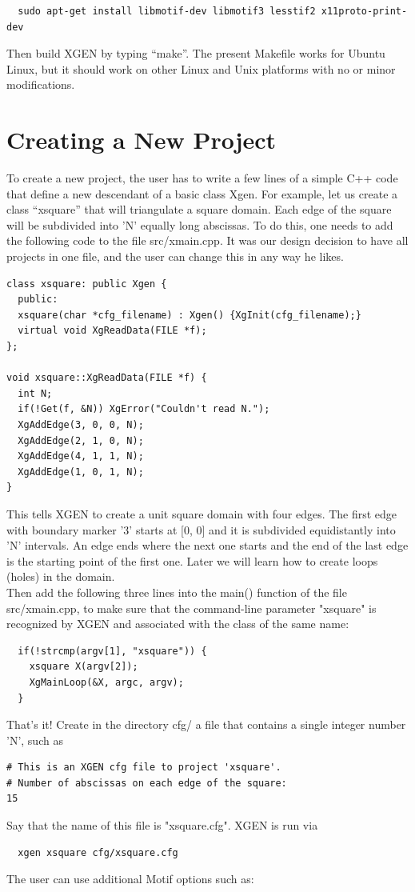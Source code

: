 \documentclass[12pt]{article}
\begin{document}
{\footnotesize
\begin{verbatim}
  sudo apt-get install libmotif-dev libmotif3 lesstif2 x11proto-print-dev
\end{verbatim}
}
\noindent
  Then build XGEN by typing ``make''. The present Makefile works for
  Ubuntu Linux, but it should work on other Linux and Unix platforms with 
  no or minor modifications.
  
  \section{Creating a New Project} \label{new-project}

  To create a new project, the user has to write 
  a few lines of a simple C++ code that define a new descendant of
  a basic class Xgen. For example, let us create a class ``xsquare''
  that will triangulate a square domain. Each edge of the square 
  will be subdivided into 'N' equally long abscissas. To do this,
  one needs to add the following code to the file src/xmain.cpp.
  It was our design decision to have all projects in one file, and
  the user can change this in any way he likes.

  \begin{verbatim}
class xsquare: public Xgen {
  public:
  xsquare(char *cfg_filename) : Xgen() {XgInit(cfg_filename);}
  virtual void XgReadData(FILE *f);
};

void xsquare::XgReadData(FILE *f) {
  int N; 
  if(!Get(f, &N)) XgError("Couldn't read N.");
  XgAddEdge(3, 0, 0, N);
  XgAddEdge(2, 1, 0, N);
  XgAddEdge(4, 1, 1, N);
  XgAddEdge(1, 0, 1, N);
}
  \end{verbatim}
This tells XGEN to create a unit square domain with four edges. The first 
  edge with boundary marker '3' starts at [0, 0] and it is subdivided 
  equidistantly into 'N' intervals. An edge ends where the next one  
  starts and the end of the last edge is the starting point of the first one.
  Later we will learn how to create loops (holes) in the domain.\\
 
  \noindent
  Then add the following three lines into the main() function of the 
  file src/xmain.cpp, to make sure that the command-line parameter
  "xsquare" is recognized by XGEN and associated with the class of
  the same name:
  \begin{verbatim}
  if(!strcmp(argv[1], "xsquare")) {
    xsquare X(argv[2]);
    XgMainLoop(&X, argc, argv);
  }
  \end{verbatim}
  That's it! Create in the directory cfg/ a file that contains a single 
  integer number 'N', such as 
  \begin{verbatim}  
# This is an XGEN cfg file to project 'xsquare'.
# Number of abscissas on each edge of the square:
15
  \end{verbatim}
  Say that the name of this file is "xsquare.cfg". XGEN is run via
  \begin{verbatim}
  xgen xsquare cfg/xsquare.cfg
  \end{verbatim}
  \noindent
  The user can use additional Motif options such as:
\end{document}
